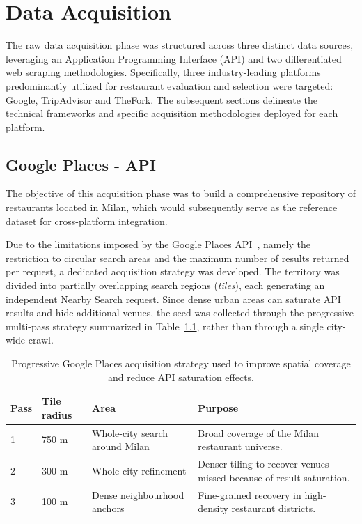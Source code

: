 \chapter{Data Acquisition}

The raw data acquisition phase was structured across three distinct data sources, leveraging an Application Programming Interface (API) and two differentiated web scraping methodologies. Specifically, three industry-leading platforms predominantly utilized for restaurant evaluation and selection were targeted: Google, TripAdvisor and TheFork. The subsequent sections delineate the technical frameworks and specific acquisition methodologies deployed for each platform.

\section{Google Places - API}

The objective of this acquisition phase was to build a comprehensive repository of restaurants located in Milan, which would subsequently serve as the reference dataset for cross-platform integration.

Due to the limitations imposed by the Google Places API~\cite{google-places}, namely the restriction to circular search areas and the maximum number of results returned per request, a dedicated acquisition strategy was developed. The territory was divided into partially overlapping search regions (\textit{tiles}), each generating an independent Nearby Search request. Since dense urban areas can saturate API results and hide additional venues, the seed was collected through the progressive multi-pass strategy summarized in Table~\ref{tab:google_acquisition_passes}, rather than through a single city-wide crawl.

\begin{table}[t]
\centering
\begin{tabular}{p{2cm}p{2.8cm}p{4.2cm}p{5cm}}
\toprule
\textbf{Pass} & \textbf{Tile radius} & \textbf{Area} & \textbf{Purpose} \\
\midrule
1 & 750 m & Whole-city search around Milan & Broad coverage of the Milan restaurant universe. \\
2 & 300 m & Whole-city refinement & Denser tiling to recover venues missed because of result saturation. \\
3 & 100 m & Dense neighbourhood anchors & Fine-grained recovery in high-density restaurant districts. \\
\bottomrule
\end{tabular}
\captionsetup{font=small}
\caption{Progressive Google Places acquisition strategy used to improve spatial coverage and reduce API saturation effects.}
\label{tab:google_acquisition_passes}
\end{table}


